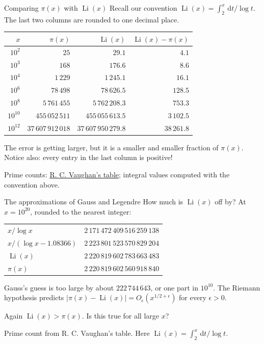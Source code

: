 \documentclass[aspectratio=169,11pt]{beamer}
\newcommand{\dd}{\,\mathrm d}
\newcommand{\link}[2]{{\color{teal}\href{#1}{#2}}}
\begin{document}
\begin{frame}{Comparing $\pi(x)$ with $\operatorname{Li}(x)$}
\small
Recall our convention $\operatorname{Li}(x)=\int_2^x\dd t/\log t$. The last two columns are rounded to one decimal place.
\begin{center}\renewcommand{\arraystretch}{1.15}
\begin{tabular}{rrrr}\toprule
$x$&$\pi(x)$&$\operatorname{Li}(x)$&$\operatorname{Li}(x)-\pi(x)$\\\midrule
$10^2$&$25$&$29.1$&$4.1$\\
$10^3$&$168$&$176.6$&$8.6$\\
$10^4$&$1\,229$&$1\,245.1$&$16.1$\\
$10^6$&$78\,498$&$78\,626.5$&$128.5$\\
$10^8$&$5\,761\,455$&$5\,762\,208.3$&$753.3$\\
$10^{10}$&$455\,052\,511$&$455\,055\,613.5$&$3\,102.5$\\
$10^{12}$&$37\,607\,912\,018$&$37\,607\,950\,279.8$&$38\,261.8$\\\bottomrule
\end{tabular}\end{center}
The error is getting larger, but it is a smaller and smaller fraction of $\pi(x)$. Notice also: every entry in the last column is positive!

{\footnotesize Prime counts: \link{https://personal.science.psu.edu/rcv4/571s25/Class571-01.pdf}{R. C. Vaughan's table}; integral values computed with the convention above.}
\end{frame}
\begin{frame}{The approximations of Gauss and Legendre}
How much is $\operatorname{Li}(x)$ off by? At $x=10^{20}$, rounded to the nearest integer:
\begin{center}\begin{tabular}{lr}
$x/\log x$&$2\,171\,472\,409\,516\,259\,138$\\
$x/(\log x-1.08366)$&$2\,223\,801\,523\,570\,829\,204$\\
$\operatorname{Li}(x)$&$2\,220\,819\,602\,783\,663\,483$\\
$\pi(x)$&$2\,220\,819\,602\,560\,918\,840$
\end{tabular}\end{center}
Gauss's guess is too large by about $222\,744\,643$, or one part in $10^{10}$. The Riemann hypothesis predicts $|\pi(x)-\operatorname{Li}(x)|=O_\epsilon(x^{1/2+\epsilon})$ for every $\epsilon>0$.

Again $\operatorname{Li}(x)>\pi(x)$. Is this true for all large $x$?

{\footnotesize Prime count from R. C. Vaughan's table. Here $\operatorname{Li}(x)=\int_2^x\dd t/\log t$.}
\end{frame}
\end{document}
